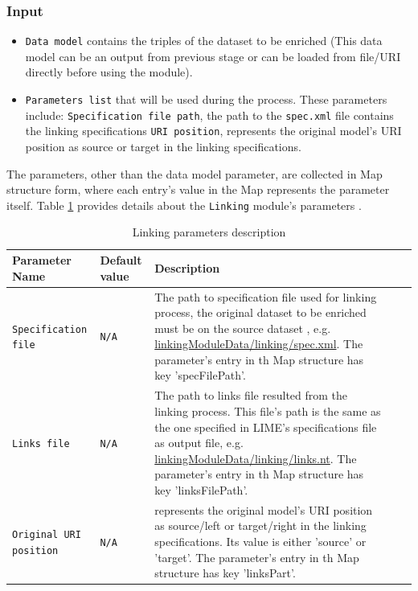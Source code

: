 \documentclass[a4paper,twoside,bibtotoc,abstracton,12pt,BCOR=15mm]{article}
\begin{document}
\subsubsection{Input}
\begin{itemize}
 \item \texttt{Data model} contains the triples of the dataset to be enriched 
 (This data model can be an output from previous stage or can be loaded from file/URI directly before using the module). 
 \item \texttt{Parameters list} that will be used during the process. These parameters include:
 \subitem \texttt{Specification file path}, the path to the \texttt{spec.xml} file contains the linking specifications
 \subitem \texttt{URI position}, represents the original model's URI position as source or target in the linking specifications.
\end{itemize}
The parameters, other than the data model parameter, are  collected in Map structure form,
where each entry's value in the Map represents the parameter itself.
Table \ref{tbl:linkingPram} provides details about the \texttt{Linking} module's parameters .
\begin{table}[ht]
\caption{Linking parameters description} \label{tbl:linkingPram}
\begin{tabular}{@{}  l  l p{7cm} l p{6cm}@{}}
\toprule
\textbf{Parameter Name} & \textbf{Default value} & \textbf{Description}\\
\midrule
\texttt{Specification file} 	& \texttt{N/A} 	& The path to specification file used for linking process, the original dataset to be enriched must be on the source dataset , e.g. \url {linkingModuleData/linking/spec.xml}. The parameter's entry in th Map structure has key 'specFilePath'.\\
\texttt{Links file} 	& \texttt{N/A} 	& The path to links file resulted from the linking process. This file's path is the same as the one specified in LIME's specifications file as output file, e.g. \url {linkingModuleData/linking/links.nt}. The parameter's entry in th Map structure has key 'linksFilePath'.\\
\texttt{Original URI position} 	& \texttt{N/A} 	& represents the original model's URI position as source/left or target/right in the linking specifications. Its value is either 'source' or 'target'. The parameter's entry in th Map structure has key 'linksPart'.\\ 
\bottomrule
\end{tabular}
\end{table}
\end{document}
